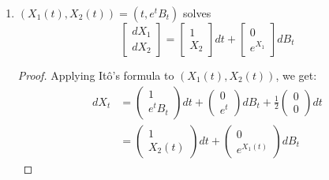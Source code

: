 \documentclass[11pt]{article}
\begin{document}
\begin{enumerate}
\begin{proof}
Applying It\^o's Lemma to $X_t = \sin B_t$:
\begin{align*}
dX_t &= 0 dt + \cos B_t dB_t + \frac{1}{2} (-\sin B_t) dB_t^2\\
&= \cos B_t dB_t -\frac{1}{2} \sin B_t dt\\
&= \frac{1}{2} \sin B_t dt + \sqrt{1-\sin^2(B_t)} dB_t\\
&= \frac{1}{2}X_t + \sqrt{1-X_t^2} dB_t
\end{align*}
where the condition on $t$ ensures the function is 1-1.  $X_0 = \sin B_0 =\sin a$, where $\pi/2 <a<\pi/2$.  Therefore $X_t = \sin B_t$ solves the SDE given.
\end{proof}
\item $\left( X _ { 1 } ( t ) , X _ { 2 } ( t ) \right) = \left( t , e ^ { t } B _ { t } \right)$ solves $$\left[ \begin{array} { l } { d X _ { 1 } } \\ { d X _ { 2 } } \end{array} \right] = \left[ \begin{array} { l } { 1 } \\ { X _ { 2 } } \end{array} \right] d t + \left[ \begin{array} { c } { 0 } \\ { e ^ { X _ { 1 } } } \end{array} \right] d B _ { t } $$
\begin{proof}
Applying It\^o's formula to $(X_1(t), X_2(t))$, we get:
\begin{align*}
dX_t &= \begin{pmatrix}
1 \\ e^t B_t
\end{pmatrix} dt +
\begin{pmatrix}
0 \\ e^t
\end{pmatrix} dB_t + 
\frac{1}{2} \begin{pmatrix}
0 \\ 0
\end{pmatrix} dt\\ &= 
\begin{pmatrix}
1 \\ X_2(t)
\end{pmatrix} dt + 
\begin{pmatrix}
0 \\ e^{X_1(t)}
\end{pmatrix} dB_t
\end{align*}

\end{proof}
\end{enumerate}
\end{document}
